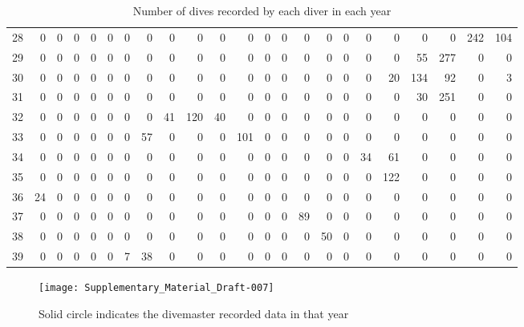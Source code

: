 \documentclass[a4paper]{article}
\begin{document}
\begin{sidewaystable}[h!]
{\begin{tabular}{rrrrrrrrrrrrrrrrrrrrrrr}
  28 &   0 &   0 &   0 &   0 &   0 &   0 &   0 &   0 &   0 &   0 &   0 &   0 &   0 &   0 &   0 &   0 &   0 &   0 &   0 &   0 & 242 & 104 \\ 
  29 &   0 &   0 &   0 &   0 &   0 &   0 &   0 &   0 &   0 &   0 &   0 &   0 &   0 &   0 &   0 &   0 &   0 &   0 &  55 & 277 &   0 &   0 \\ 
  30 &   0 &   0 &   0 &   0 &   0 &   0 &   0 &   0 &   0 &   0 &   0 &   0 &   0 &   0 &   0 &   0 &   0 &  20 & 134 &  92 &   0 &   3 \\ 
  31 &   0 &   0 &   0 &   0 &   0 &   0 &   0 &   0 &   0 &   0 &   0 &   0 &   0 &   0 &   0 &   0 &   0 &   0 &  30 & 251 &   0 &   0 \\ 
  32 &   0 &   0 &   0 &   0 &   0 &   0 &   0 &  41 & 120 &  40 &   0 &   0 &   0 &   0 &   0 &   0 &   0 &   0 &   0 &   0 &   0 &   0 \\ 
  33 &   0 &   0 &   0 &   0 &   0 &   0 &  57 &   0 &   0 &   0 & 101 &   0 &   0 &   0 &   0 &   0 &   0 &   0 &   0 &   0 &   0 &   0 \\ 
  34 &   0 &   0 &   0 &   0 &   0 &   0 &   0 &   0 &   0 &   0 &   0 &   0 &   0 &   0 &   0 &   0 &  34 &  61 &   0 &   0 &   0 &   0 \\ 
  35 &   0 &   0 &   0 &   0 &   0 &   0 &   0 &   0 &   0 &   0 &   0 &   0 &   0 &   0 &   0 &   0 &   0 & 122 &   0 &   0 &   0 &   0 \\ 
  36 &  24 &   0 &   0 &   0 &   0 &   0 &   0 &   0 &   0 &   0 &   0 &   0 &   0 &   0 &   0 &   0 &   0 &   0 &   0 &   0 &   0 &   0 \\ 
  37 &   0 &   0 &   0 &   0 &   0 &   0 &   0 &   0 &   0 &   0 &   0 &   0 &   0 &  89 &   0 &   0 &   0 &   0 &   0 &   0 &   0 &   0 \\ 
  38 &   0 &   0 &   0 &   0 &   0 &   0 &   0 &   0 &   0 &   0 &   0 &   0 &   0 &   0 &  50 &   0 &   0 &   0 &   0 &   0 &   0 &   0 \\ 
  39 &   0 &   0 &   0 &   0 &   0 &   7 &  38 &   0 &   0 &   0 &   0 &   0 &   0 &   0 &   0 &   0 &   0 &   0 &   0 &   0 &   0 &   0 \\ 
   \hline
\end{tabular}
}
\caption{Number of dives recorded by each diver in each year} 
\label{table1}
\end{sidewaystable}

\begin{figure}[h!]
\texttt{[image: Supplementary\_Material\_Draft-007]}
\caption{Solid circle indicates the divemaster recorded data in that year}
\end{figure}
\end{document}
